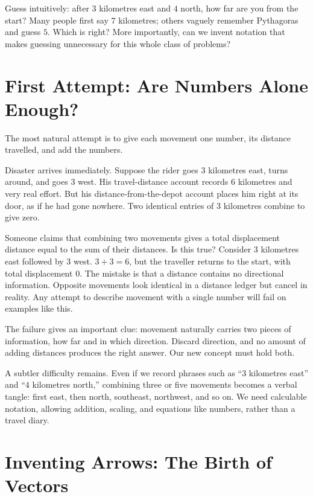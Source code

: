 Guess intuitively: after $3$ kilometres east and $4$ north, how far are you from the start? Many people first say $7$ kilometres; others vaguely remember Pythagoras and guess $5$. Which is right? More importantly, can we invent notation that makes guessing unnecessary for this whole class of problems?

\section{First Attempt: Are Numbers Alone Enough?}

The most natural attempt is to give each movement one number, its distance travelled, and add the numbers.

Disaster arrives immediately. Suppose the rider goes $3$ kilometres east, turns around, and goes $3$ west. His travel-distance account records $6$ kilometres and very real effort. But his distance-from-the-depot account places him right at its door, as if he had gone nowhere. Two identical entries of $3$ kilometres combine to give zero.

\begin{fanli}
Someone claims that combining two movements gives a total displacement distance equal to the sum of their distances. Is this true? Consider $3$ kilometres east followed by $3$ west. $3+3=6$, but the traveller returns to the start, with total displacement $0$. The mistake is that a distance contains no directional information. Opposite movements look identical in a distance ledger but cancel in reality. Any attempt to describe movement with a single number will fail on examples like this.
\end{fanli}

The failure gives an important clue: movement naturally carries two pieces of information, how far and in which direction. Discard direction, and no amount of adding distances produces the right answer. Our new concept must hold both.

A subtler difficulty remains. Even if we record phrases such as ``$3$ kilometres east'' and ``$4$ kilometres north,'' combining three or five movements becomes a verbal tangle: first east, then north, southeast, northwest, and so on. We need calculable notation, allowing addition, scaling, and equations like numbers, rather than a travel diary.

\section{Inventing Arrows: The Birth of Vectors}

